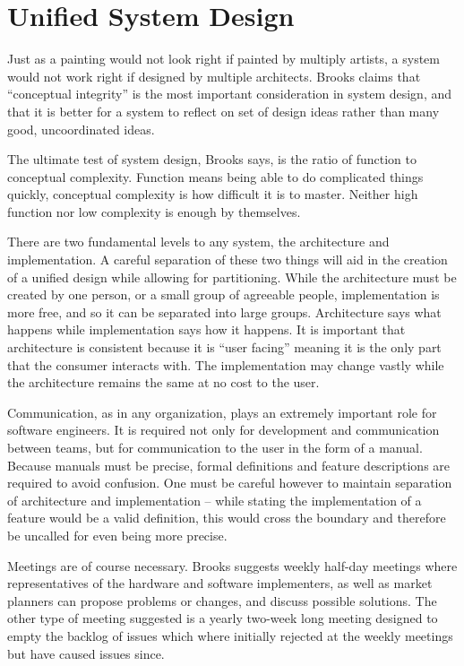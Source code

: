 \section{Unified System Design}
Just as a painting would not look right if painted by multiply artists, a system would not work right if designed by multiple architects.  Brooks claims that ``conceptual integrity'' is the most important consideration in system design, and that it is better for a system to reflect on set of design ideas rather than many good, uncoordinated ideas.

The ultimate test of system design, Brooks says, is the ratio of function to conceptual complexity.  Function means being able to do complicated things quickly, conceptual complexity is how difficult it is to master.  Neither high function nor low complexity is enough by themselves.

There are two fundamental levels to any system, the architecture and implementation.  A careful separation of these two things will aid in the creation of a unified design while allowing for partitioning.  While the architecture must be created by one person, or a small group of agreeable people, implementation is more free, and so it can be separated into large groups.  Architecture says what happens while implementation says how it happens.  It is important that architecture is consistent because it is ``user facing'' meaning it is the only part that the consumer interacts with.  The implementation may change vastly while the architecture remains the same at no cost to the user.

Communication, as in any organization, plays an extremely important role for software engineers.  It is required not only for development and communication between teams, but for communication to the user in the form of a manual.  Because manuals must be precise, formal definitions and feature descriptions are required to avoid confusion.  One must be careful however to maintain separation of architecture and implementation -- while stating the implementation of a feature would be a valid definition, this would cross the boundary and therefore be uncalled for even being more precise.

Meetings are of course necessary.  Brooks suggests weekly half-day meetings where representatives of the hardware and software implementers, as well as market planners can propose problems or changes, and discuss possible solutions.  The other type of meeting suggested is a yearly two-week long meeting designed to empty the backlog of issues which where initially rejected at the weekly meetings but have caused issues since.
